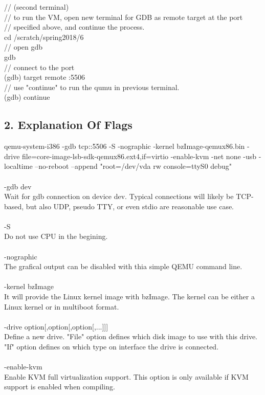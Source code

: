 \documentclass[english,10pt,letterpaper,onecolumn]{IEEEtran}
\begin{document}
// (second terminal)\\
// to run the VM, open new terminal for GDB as remote target at the port\\
// specified above, and continue the process.\\ 
cd /scratch/spring2018/6\\
// open gdb\\
gdb\\
// connect to the port\\
(gdb) target remote :5506\\
// use "continue" to run the qumu in previous terminal.\\
(gdb) continue\\

\subsection*{\bf 2. Explanation Of Flags}
qemu-system-i386 -gdb tcp::5506 -S -nographic -kernel bzImage-qemux86.bin -drive file=core-image-lsb-sdk-qemux86.ext4,if=virtio -enable-kvm -net none -usb -localtime --no-reboot --append "root=/dev/vda rw console=ttyS0 debug"\\\\
-gdb dev\\
Wait for gdb connection on device dev. Typical connections will likely be TCP-based, but also UDP, pseudo TTY, or even stdio are reasonable use case.\\\\
-S\\
Do not use CPU in the begining.\\\\
-nographic\\
The grafical output can be disabled with thia simple QEMU command line.\\\\ 
-kernel bzImage\\
It will provide the Linux kernel image with bzImage. The kernel can be either a Linux kernel or in multiboot format.\\\\ 
-drive option[,option[,option[,...]]]\\
Define a new drive. "File" option defines which disk image to use with this drive. "If" option defines on which type on interface the drive is connected.\\\\
-enable-kvm\\
Enable KVM full virtualization support. This option is only available if KVM support is enabled when compiling.\\\\ 
\end{document}
